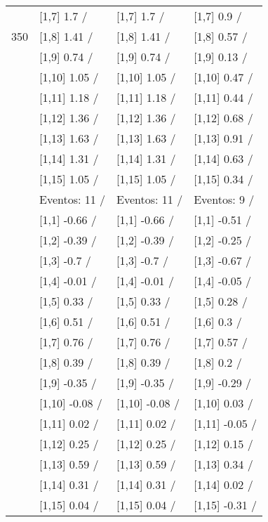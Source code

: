\begin{table}
\begin{tabular}[t]{llll}
 & {}[1,7] 1.7  / & {}[1,7] 1.7  / & {}[1,7] 0.9  /\\
350 & {}[1,8] 1.41  / & {}[1,8] 1.41  / & {}[1,8] 0.57  /\\
\addlinespace
 & {}[1,9] 0.74  / & {}[1,9] 0.74  / & {}[1,9] 0.13  /\\
 & {}[1,10] 1.05  / & {}[1,10] 1.05  / & {}[1,10] 0.47  /\\
 & {}[1,11] 1.18  / & {}[1,11] 1.18  / & {}[1,11] 0.44  /\\
 & {}[1,12] 1.36  / & {}[1,12] 1.36  / & {}[1,12] 0.68  /\\
 & {}[1,13] 1.63  / & {}[1,13] 1.63  / & {}[1,13] 0.91  /\\
\addlinespace
 & {}[1,14] 1.31  / & {}[1,14] 1.31  / & {}[1,14] 0.63  /\\
 & {}[1,15] 1.05  / & {}[1,15] 1.05  / & {}[1,15] 0.34  /\\
 & Eventos:  11 / & Eventos:  11 / & Eventos:  9 /\\
 & {}[1,1] -0.66  / & {}[1,1] -0.66  / & {}[1,1] -0.51  /\\
 & {}[1,2] -0.39  / & {}[1,2] -0.39  / & {}[1,2] -0.25  /\\
\addlinespace
 & {}[1,3] -0.7  / & {}[1,3] -0.7  / & {}[1,3] -0.67  /\\
 & {}[1,4] -0.01  / & {}[1,4] -0.01  / & {}[1,4] -0.05  /\\
 & {}[1,5] 0.33  / & {}[1,5] 0.33  / & {}[1,5] 0.28  /\\
 & {}[1,6] 0.51  / & {}[1,6] 0.51  / & {}[1,6] 0.3  /\\
 & {}[1,7] 0.76  / & {}[1,7] 0.76  / & {}[1,7] 0.57  /\\
\addlinespace
500 & {}[1,8] 0.39  / & {}[1,8] 0.39  / & {}[1,8] 0.2  /\\
 & {}[1,9] -0.35  / & {}[1,9] -0.35  / & {}[1,9] -0.29  /\\
 & {}[1,10] -0.08  / & {}[1,10] -0.08  / & {}[1,10] 0.03  /\\
 & {}[1,11] 0.02  / & {}[1,11] 0.02  / & {}[1,11] -0.05  /\\
 & {}[1,12] 0.25  / & {}[1,12] 0.25  / & {}[1,12] 0.15  /\\
\addlinespace
 & {}[1,13] 0.59  / & {}[1,13] 0.59  / & {}[1,13] 0.34  /\\
 & {}[1,14] 0.31  / & {}[1,14] 0.31  / & {}[1,14] 0.02  /\\
 & {}[1,15] 0.04  / & {}[1,15] 0.04  / & {}[1,15] -0.31  /\\
\bottomrule
\end{tabular}
\end{table}
